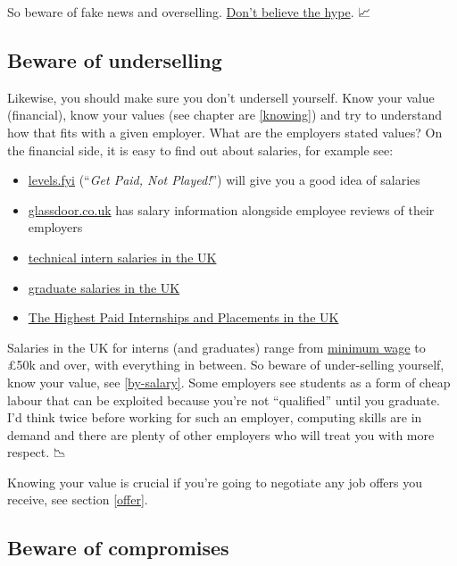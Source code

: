 \documentclass[
]{book}
\providecommand{\tightlist}{%
  \setlength{\itemsep}{0pt}\setlength{\parskip}{0pt}}
\begin{document}
So beware of fake news and overselling. \href{https://en.wikipedia.org/wiki/Don\%27t_Believe_the_Hype}{Don't believe the hype}. \citep{dontbelievethehype} 📈

\hypertarget{undersell}{%
\subsection{Beware of underselling}\label{undersell}}

Likewise, you should make sure you don't undersell yourself. Know your value (financial), know your values (see chapter are \ref{knowing}) and try to understand how that fits with a given employer. What are the employers stated values? On the financial side, it is easy to find out about salaries, for example see:

\begin{itemize}
\tightlist
\item
  \href{https://www.levels.fyi/}{levels.fyi} (``\emph{Get Paid, Not Played!}'') will give you a good idea of salaries
\item
  \href{https://www.glassdoor.co.uk/}{glassdoor.co.uk} has salary information alongside employee reviews of their employers
\item
  \href{https://github.com/IgWod/interns-salaries-uk-2018}{technical intern salaries in the UK} \citep{igwod}
\item
  \href{https://luminate.prospects.ac.uk/graduate-salaries-in-the-uk}{graduate salaries in the UK} \citep{michaelgrove}
\item
  \href{https://www.ratemyplacement.co.uk/blog/highest-paid-internships-placements-uk/}{The Highest Paid Internships and Placements in the UK} \citep{louiseintern}
\end{itemize}

Salaries in the UK for interns (and graduates) range from \href{https://www.gov.uk/national-minimum-wage}{minimum wage} to £50k and over, with everything in between. So beware of under-selling yourself, know your value, see \ref{by-salary}. Some employers see students as a form of cheap labour that can be exploited because you're not ``qualified'' until you graduate. I'd think twice before working for such an employer, computing skills are in demand and there are plenty of other employers who will treat you with more respect. 📉

Knowing your value is crucial if you're going to negotiate any job offers you receive, see section \ref{offer}.

\hypertarget{compromises}{%
\subsection{Beware of compromises}\label{compromises}}
\end{document}
